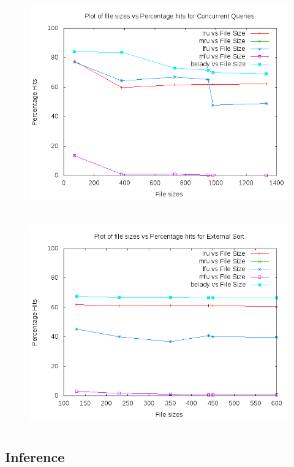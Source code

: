 \begin{figure}[H]
\includegraphics[width=12cm, height=9cm]{randomfilesize.png}

\end{figure}
\begin{figure}[H]
\includegraphics[width=12cm, height=9cm]{sortfilesize.png}

\end{figure}

\subsection*{{Inference}}

